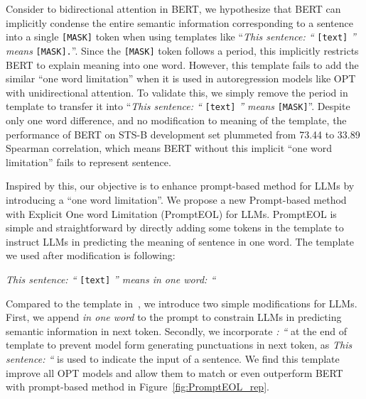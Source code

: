\documentclass{article}
\begin{document}
Consider to bidirectional attention in BERT, we hypothesize that BERT can implicitly condense the entire semantic information corresponding to a sentence into a single \texttt{[MASK]} token when using templates like ``\textit{This sentence: ``} \texttt{[text]} \textit{'' means} \texttt{[MASK].}''.
Since the \texttt{[MASK]} token follows a period, this implicitly restricts BERT to explain meaning into one word.
However, this template fails to add the similar ``one word limitation'' when it is used in autoregression models like OPT with unidirectional attention.
To validate this, we simply remove the period in template to transfer it into ``\textit{This sentence: ``} \texttt{[text]} \textit{'' means} \texttt{[MASK]}''.
Despite only one word difference, and no modification to meaning of the template, the performance of BERT on STS-B development set plummeted from 73.44 to 33.89 Spearman correlation, which means BERT without this implicit ``one word limitation'' fails to represent sentence.

Inspired by this, our objective is to enhance prompt-based method for LLMs by introducing a ``one word limitation''.
We propose a new Prompt-based method with Explicit One word Limitation (PromptEOL) for LLMs.
PromptEOL is simple and straightforward by directly adding some tokens in the template to instruct LLMs in predicting the meaning of sentence in one word.
The template we used after modification is following:

\centerline{\textit{This sentence: ``} \texttt{[text]} \textit{'' means in one word: ``}}

Compared to the template in~\cite{jiang2022promptbert}, we introduce two simple modifications for LLMs.
First, we append \textit{in one word} to the prompt to constrain LLMs in predicting semantic information in next token.
Secondly, we incorporate \textit{: ``} at the end of template to prevent model form generating punctuations in next token, as \textit{This sentence: ``} is used to indicate the input of a sentence.
We find this template improve all OPT models and allow them to match or even outperform BERT with prompt-based method in Figure~\ref{fig:PromptEOL_rep}.
\end{document}
